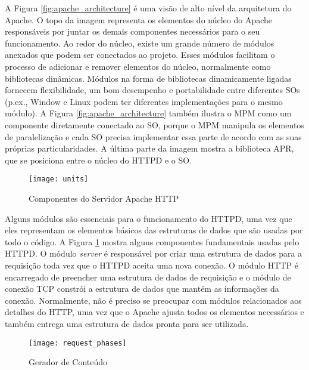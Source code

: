 A Figura \ref{fig:apache_architecture} é uma visão de alto nível da arquitetura
do Apache. O topo da imagem representa os elementos do núcleo do Apache
responsáveis por juntar os demais componentes necessários para o seu
funcionamento. Ao redor do núcleo, existe um grande número de módulos anexados
que podem ser conectados ao projeto. Esses módulos facilitam o processo de
adicionar e remover elementos do núcleo, normalmente como bibliotecas
dinâmicas. Módulos na forma de bibliotecas dinamicamente ligadas fornecem
flexibilidade, um bom desempenho e portabilidade entre diferentes SOs (p.ex.,
Window e Linux podem ter diferentes implementações para o mesmo módulo). A
Figura \ref{fig:apache_architecture} também ilustra o MPM como um componente
diretamente conectado ao SO, porque o MPM manipula os elementos de
paralelização e cada SO precisa implementar essa parte de acordo com as suas
próprias particularidades. A última parte da imagem mostra a biblioteca APR,
que se posiciona entre o núcleo do HTTPD e o SO.

\begin{figure}[!h]
  \centering
  \texttt{[image: units]} 
  \caption{Componentes do Servidor Apache HTTP}
  \label{fig:units} 
\end{figure}

Alguns módulos são essenciais para o funcionamento do HTTPD, uma vez que eles
representam os elementos básicos das estruturas de dados que são usadas por
todo o código. A Figura \ref{fig:units} mostra alguns componentes fundamentais
usadas pelo HTTPD. O módulo \emph{server} é responsável por criar uma estrutura de
dados para a requisição toda vez que o HTTPD aceita uma nova conexão. O módulo
HTTP é encarregado de preencher uma estrutura de dados de requisição e o
módulo de conexão TCP constrói a estrutura de dados que mantém as informações
da conexão. Normalmente, não é preciso se preocupar com módulos relacionados
aos detalhes do HTTP, uma vez que o Apache ajusta todos os elementos necessários
e também entrega uma estrutura de dados pronta para ser utilizada.

\begin{figure}[!h]
  \centering
  \texttt{[image: request\_phases]} 
	\caption[Gerador de Conteúdo]{Gerador de Conteúdo \citep{apache_module_book}}
  \label{fig:content_generator} 
\end{figure}

